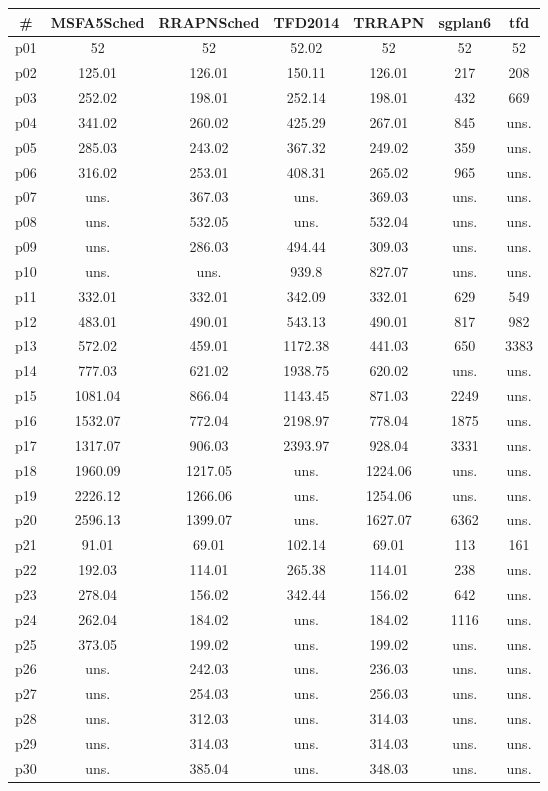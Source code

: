 \begin{tabular}{ccccccc}
\toprule
\textbf{\#} & \textbf{MSFA5Sched} & \textbf{RRAPNSched} & \textbf{TFD2014} & \textbf{TRRAPN} & \textbf{sgplan6} & \textbf{tfd}\\
\midrule
p01 & 52 & 52 & 52.02 & 52 & 52 & 52\\
p02 & 125.01 & 126.01 & 150.11 & 126.01 & 217 & 208\\
p03 & 252.02 & 198.01 & 252.14 & 198.01 & 432 & 669\\
p04 & 341.02 & 260.02 & 425.29 & 267.01 & 845 & uns.\\
p05 & 285.03 & 243.02 & 367.32 & 249.02 & 359 & uns.\\
p06 & 316.02 & 253.01 & 408.31 & 265.02 & 965 & uns.\\
p07 & uns. & 367.03 & uns. & 369.03 & uns. & uns.\\
p08 & uns. & 532.05 & uns. & 532.04 & uns. & uns.\\
p09 & uns. & 286.03 & 494.44 & 309.03 & uns. & uns.\\
p10 & uns. & uns. & 939.8 & 827.07 & uns. & uns.\\
p11 & 332.01 & 332.01 & 342.09 & 332.01 & 629 & 549\\
p12 & 483.01 & 490.01 & 543.13 & 490.01 & 817 & 982\\
p13 & 572.02 & 459.01 & 1172.38 & 441.03 & 650 & 3383\\
p14 & 777.03 & 621.02 & 1938.75 & 620.02 & uns. & uns.\\
p15 & 1081.04 & 866.04 & 1143.45 & 871.03 & 2249 & uns.\\
p16 & 1532.07 & 772.04 & 2198.97 & 778.04 & 1875 & uns.\\
p17 & 1317.07 & 906.03 & 2393.97 & 928.04 & 3331 & uns.\\
p18 & 1960.09 & 1217.05 & uns. & 1224.06 & uns. & uns.\\
p19 & 2226.12 & 1266.06 & uns. & 1254.06 & uns. & uns.\\
p20 & 2596.13 & 1399.07 & uns. & 1627.07 & 6362 & uns.\\
p21 & 91.01 & 69.01 & 102.14 & 69.01 & 113 & 161\\
p22 & 192.03 & 114.01 & 265.38 & 114.01 & 238 & uns.\\
p23 & 278.04 & 156.02 & 342.44 & 156.02 & 642 & uns.\\
p24 & 262.04 & 184.02 & uns. & 184.02 & 1116 & uns.\\
p25 & 373.05 & 199.02 & uns. & 199.02 & uns. & uns.\\
p26 & uns. & 242.03 & uns. & 236.03 & uns. & uns.\\
p27 & uns. & 254.03 & uns. & 256.03 & uns. & uns.\\
p28 & uns. & 312.03 & uns. & 314.03 & uns. & uns.\\
p29 & uns. & 314.03 & uns. & 314.03 & uns. & uns.\\
p30 & uns. & 385.04 & uns. & 348.03 & uns. & uns.\\
\bottomrule
\end{tabular}

